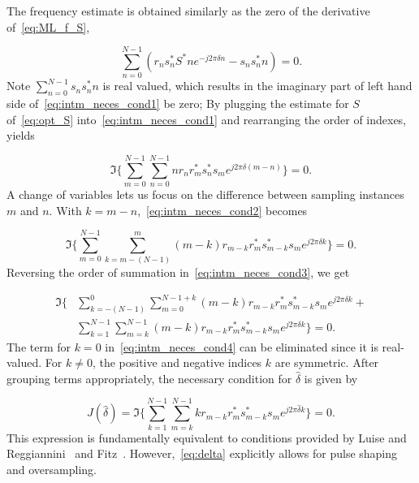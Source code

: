 The frequency estimate is obtained similarly as the zero of the
derivative of~\eqref{eq:ML_f_S},

\begin{equation}
    \label{eq:intm_neces_cond1}
    \sum_{n=0}^{N-1}{(r_{n}s_n^{*}S^{*}ne^{-j2\pi \delta n}-s_ns_n^{*}n)=0}.
    \end{equation}
Note $\sum_{n=0}^{N-1}{s_ns_n^{*}n}$ is real
valued, which results in the imaginary part of left hand side of~\eqref{eq:intm_neces_cond1} be zero;
By plugging the estimate for $S$ of~\eqref{eq:opt_S} into~\eqref{eq:intm_neces_cond1} and rearranging the order of indexes, yields

\begin{equation}
    \label{eq:intm_neces_cond2}
    \Im\bigg\{\sum_{m=0}^{N-1}{\sum_{n=0}^{N-1}{nr_{n}r_{m}^{*}s_n^{*}s_me^{j2\pi \delta(m-n)}}}\bigg\} = 0.
  \end{equation}
A change of variables lets us focus on the difference between sampling instances $m$ and $n$.
With $k=m-n$,~\eqref{eq:intm_neces_cond2} becomes

\begin{equation}
    \label{eq:intm_neces_cond3}
    \Im\bigg\{\sum_{m=0}^{N-1}{\sum_{k{=}m-(N-1)}^{m}{(m{-}k)r_{m-k}r_{m}^{*}s_{m-k}^{*}s_me^{j2\pi \delta k}}}\bigg\}=0.
  \end{equation}
Reversing the order of summation in~\eqref{eq:intm_neces_cond3}, we get

\begin{equation}
    \begin{aligned}
    \label{eq:intm_neces_cond4}
    \Im\bigg\{&\sum_{k=-(N-1)}^{0}\sum_{m=0}^{N-1+k}{(m{-}k)r_{m-k}r_{m}^{*}s_{m-k}^{*}s_me^{j2\pi \delta k}+}\\
    &\sum_{k=1}^{N-1}\sum_{m=k}^{N-1}{(m{-}k)r_{m-k}r_{m}^{*}s_{m-k}^{*}s_me^{j2\pi \delta k}}\bigg\}= 0.
    \end{aligned}
  \end{equation}
The term for $k{=}0$ in~\eqref{eq:intm_neces_cond4} can be eliminated since it is real-valued. For $k \neq 0$, the positive and negative indices $k$ are symmetric. 
After grouping terms appropriately, the necessary condition for $\hat{\delta}$ is given by

\begin{equation}
    \label{eq:delta}
    J(\hat{\delta}) = \Im\bigg\{\sum_{k=1}^{N-1}{\sum_{m=k}^{N-1}{kr_{m-k}r_m^{*}s_{m-k}^{*}s_m}e^{j2\pi\hat{\delta}k}}\bigg\}=0.
    \end{equation}
This expression is fundamentally equivalent to conditions provided by Luise and Reggiannini~\cite{Luise_Reggiannini_95} and Fitz~\cite{Fitz_94}.
However,~\eqref{eq:delta} explicitly allows for pulse shaping and oversampling.

